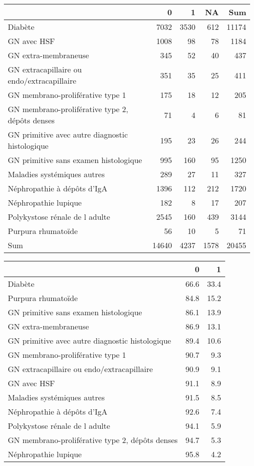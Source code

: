 \documentclass[11pt,a4paper]{article}\usepackage[]{graphicx}\usepackage[]{color}
\begin{document}
\begin{table}[H]
\centering
\begin{tabular}{lrrrr}
  \hline
 & 0 & 1 & NA & Sum \\ 
  \hline
Diabète & 7032 & 3530 & 612 & 11174 \\ 
  GN avec HSF & 1008 & 98 & 78 & 1184 \\ 
  GN extra-membraneuse & 345 & 52 & 40 & 437 \\ 
  GN extracapillaire ou endo/extracapillaire & 351 & 35 & 25 & 411 \\ 
  GN membrano-proliférative type 1 & 175 & 18 & 12 & 205 \\ 
  GN membrano-proliférative type 2, dépôts denses & 71 & 4 & 6 & 81 \\ 
  GN primitive avec autre diagnostic histologique & 195 & 23 & 26 & 244 \\ 
  GN primitive sans examen histologique & 995 & 160 & 95 & 1250 \\ 
  Maladies systémiques autres & 289 & 27 & 11 & 327 \\ 
  Néphropathie à dépôts d'IgA & 1396 & 112 & 212 & 1720 \\ 
  Néphropathie lupique & 182 & 8 & 17 & 207 \\ 
  Polykystose rénale de l adulte & 2545 & 160 & 439 & 3144 \\ 
  Purpura rhumatoïde & 56 & 10 & 5 & 71 \\ 
  Sum & 14640 & 4237 & 1578 & 20455 \\ 
   \hline
\end{tabular}
\end{table}
\begin{table}[H]
\centering
\begin{tabular}{lrr}
  \hline
 & 0 & 1 \\ 
  \hline
Diabète & 66.6 & 33.4 \\ 
  Purpura rhumatoïde & 84.8 & 15.2 \\ 
  GN primitive sans examen histologique & 86.1 & 13.9 \\ 
  GN extra-membraneuse & 86.9 & 13.1 \\ 
  GN primitive avec autre diagnostic histologique & 89.4 & 10.6 \\ 
  GN membrano-proliférative type 1 & 90.7 & 9.3 \\ 
  GN extracapillaire ou endo/extracapillaire & 90.9 & 9.1 \\ 
  GN avec HSF & 91.1 & 8.9 \\ 
  Maladies systémiques autres & 91.5 & 8.5 \\ 
  Néphropathie à dépôts d'IgA & 92.6 & 7.4 \\ 
  Polykystose rénale de l adulte & 94.1 & 5.9 \\ 
  GN membrano-proliférative type 2, dépôts denses & 94.7 & 5.3 \\ 
  Néphropathie lupique & 95.8 & 4.2 \\ 
   \hline
\end{tabular}
\end{table}
\end{document}
